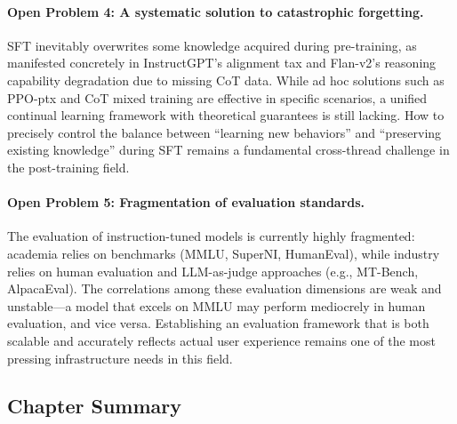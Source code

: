 \begin{openproblembox}
\paragraph{Open Problem 4: A systematic solution to catastrophic forgetting.}
SFT inevitably overwrites some knowledge acquired during pre-training,
as manifested concretely in InstructGPT's alignment tax and Flan-v2's reasoning capability degradation due to missing CoT data.
While ad hoc solutions such as PPO-ptx and CoT mixed training are effective in specific scenarios,
a unified continual learning framework with theoretical guarantees is still lacking.
How to precisely control the balance between ``learning new behaviors'' and ``preserving existing knowledge'' during SFT
remains a fundamental cross-thread challenge in the post-training field.
\end{openproblembox}

\begin{openproblembox}
\paragraph{Open Problem 5: Fragmentation of evaluation standards.}
The evaluation of instruction-tuned models is currently highly fragmented:
academia relies on benchmarks (MMLU, SuperNI, HumanEval),
while industry relies on human evaluation and LLM-as-judge approaches (e.g., MT-Bench, AlpacaEval).
The correlations among these evaluation dimensions are weak and unstable---a
model that excels on MMLU may perform mediocrely in human evaluation, and vice versa.
Establishing an evaluation framework that is both scalable and accurately reflects actual user experience
remains one of the most pressing infrastructure needs in this field.
\end{openproblembox}


\subsection{Chapter Summary}
\label{sec:t1-summary}

